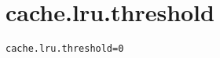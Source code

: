 \section{cache.lru.threshold}
\label{configuration:CacheLruThreshold}
\AvailableInJavaAndCsharp{\TODO}
\begin{lstlisting}[style=Props,caption={Usage example for \textit{cache.lru.threshold}}]
cache.lru.threshold=0
\end{lstlisting}